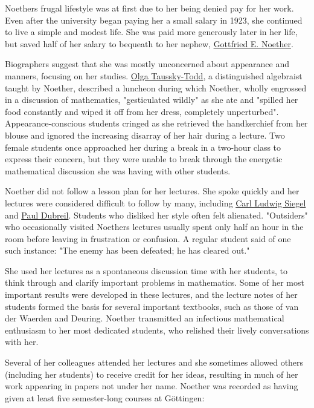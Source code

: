 Noether\textquotesingle s frugal lifestyle was at first due to her being denied pay for her work. Even after the university began paying her a small salary in 1923, she continued to live a simple and modest life. She was paid more generously later in her life, but saved half of her salary to bequeath to her nephew, \href{https://en.wikipedia.org/wiki/Gottfried_E._Noether}{Gottfried E. Noether}.

Biographers suggest that she was mostly unconcerned about appearance and manners, focusing on her studies. \href{https://en.wikipedia.org/wiki/Olga_Taussky-Todd}{Olga Taussky-Todd}, a distinguished algebraist taught by Noether, described a luncheon during which Noether, wholly engrossed in a discussion of mathematics, "gesticulated wildly" as she ate and "spilled her food constantly and wiped it off from her dress, completely unperturbed". Appearance-conscious students cringed as she retrieved the handkerchief from her blouse and ignored the increasing disarray of her hair during a lecture. Two female students once approached her during a break in a two-hour class to express their concern, but they were unable to break through the energetic mathematical discussion she was having with other students.

Noether did not follow a lesson plan for her lectures. She spoke quickly and her lectures were considered difficult to follow by many, including \href{https://en.wikipedia.org/wiki/Carl_Ludwig_Siegel}{Carl Ludwig Siegel} and \href{https://en.wikipedia.org/wiki/Paul_Dubreil}{Paul Dubreil}. Students who disliked her style often felt alienated. "Outsiders" who occasionally visited Noether\textquotesingle s lectures usually spent only half an hour in the room before leaving in frustration or confusion. A regular student said of one such instance: "The enemy has been defeated; he has cleared out."

She used her lectures as a spontaneous discussion time with her students, to think through and clarify important problems in mathematics. Some of her most important results were developed in these lectures, and the lecture notes of her students formed the basis for several important textbooks, such as those of van der Waerden and Deuring. Noether transmitted an infectious mathematical enthusiasm to her most dedicated students, who relished their lively conversations with her.

Several of her colleagues attended her lectures and she sometimes allowed others (including her students) to receive credit for her ideas, resulting in much of her work appearing in papers not under her name. Noether was recorded as having given at least five semester-long courses at Göttingen:

